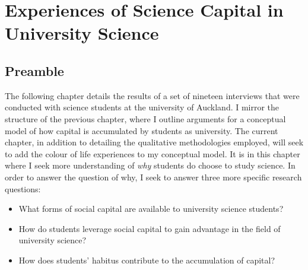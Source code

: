\chapter{Experiences of Science Capital in University Science}

\section{Preamble}
The following chapter details the results of a set of nineteen interviews that were conducted with science students at the university of Auckland. I mirror the structure of the previous chapter, where I outline arguments for a conceptual model of how capital is accumulated by students as university. The current chapter, in addition to detailing the qualitative methodologies employed, will seek to add the colour of life experiences to my conceptual model. It is in this chapter where I seek more understanding of \textit{why} students do choose to study science. In order to answer the question of why, I seek to answer three more specific research questions:
\begin{itemize}
    \item What forms of social capital are available to university science students? 
    \item How do students leverage social capital to gain advantage in the field of university science? 
    \item How does students' habitus contribute to the accumulation of capital?
\end{itemize}


